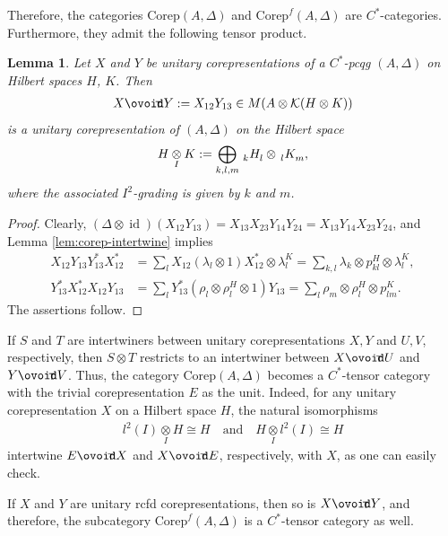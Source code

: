 \documentclass[11pt]{article}
\newcommand{\Corep}{\mathrm{Corep}}
\newcommand{\Corepf}{\mathrm{Corep}^{f}}
\DeclareMathOperator{\id}{id}
\newcommand{\Circt}{{\mathop{\ooalign{$\ovoid$\cr\hidewidth\raise-.05ex\hbox{$\scriptstyle\mathsf T\mkern3.5mu$}\cr}}}} %
\newcommand{\itimes}{\underset{I}{\otimes}}
\newcommand{\Gr}[5]{\,\tensor*[^{#2}_{#4}]{#1}{^{#3}_{#5}}}%
\newcommand{\Grd}[3]{\Gr{#1}{}{}{#2}{#3}}
\newtheorem{Lem}[Theorem]{Lemma}
\theoremstyle{definition}
\numberwithin{equation}{section}
\begin{document}
Therefore, the categories $\Corep(A,\Delta)$ and $\Corepf(A,\Delta)$ are
$C^{*}$-categories. Furthermore, they admit the following tensor product.
\begin{Lem}
  Let $X$ and $Y$ be unitary corepresentations of a $C^{*}$-pcqg $(A,\Delta)$ on Hilbert spaces $H$,
  $K$. Then
    \begin{align*}
      X \Circt Y:= X_{12}Y_{13} \in M(A \otimes \mathcal{K}(H \otimes K))
    \end{align*}
    is a unitary corepresentation of $(A,\Delta)$ on the Hilbert space
    \begin{align*}
      H \itimes K := \bigoplus_{k,l,m} \Grd{H}{k}{l} \otimes \Grd{K}{l}{m},
    \end{align*}
    where the  associated $I^{2}$-grading is given by  $k$ and $m$.
\end{Lem}
\begin{proof}
Clearly,
$(\Delta \otimes \id)(X_{12}Y_{13}) = X_{13}X_{23}Y_{14}Y_{24} =
    X_{13}Y_{14}X_{23}Y_{24}$,
and Lemma \ref{lem:corep-intertwine} implies 
\begin{align*} %
  X_{12}Y_{13}Y_{13}^{*}X_{12}^{*} &= \sum_{l} X_{12}(\lambda_{l}
  \otimes 1)X_{12}^* \otimes \lambda_{l}^{K} = \sum_{k,l} \lambda_{k}
  \otimes p_{kl}^{H} \otimes \lambda_{l}^{K}, \\
  Y_{13}^{*}X_{12}^{*}X_{12}Y_{13} &= \sum_{l} Y_{13}^{*}(\rho_{l}
  \otimes \rho_{l}^{H}\otimes 1)Y_{13}  = \sum_{l} \rho_{m} \otimes
  \rho_{l}^{H} \otimes p_{lm}^{K}. 
\end{align*}
The assertions follow. 
\end{proof}
If $S$ and $T$ are intertwiners between unitary corepresentations $X,Y$ and $U,V$, respectively,
then $S\otimes T$ restricts to an intertwiner between $X\Circt U$ and $Y\Circt V$.  
Thus, the category $\Corep(A,\Delta)$ becomes a $C^{*}$-tensor category with the trivial corepresentation $E$ as the unit. 
Indeed, for any unitary corepresentation $X$ on a Hilbert space $H$, the natural isomorphisms
\begin{align*}
  l^{2}(I) \itimes H \cong H  \quad \text{and} \quad H \itimes l^{2}(I)\cong H
\end{align*}
intertwine $E \Circt X$ and $X\Circt E$, respectively, with $X$, as one can easily check.

If $X$ and $Y$ are unitary rcfd corepresentations, then so is $X\Circt Y$, and therefore,  the subcategory
$\Corepf(A,\Delta)$ is a $C^{*}$-tensor category as well.
\end{document}
